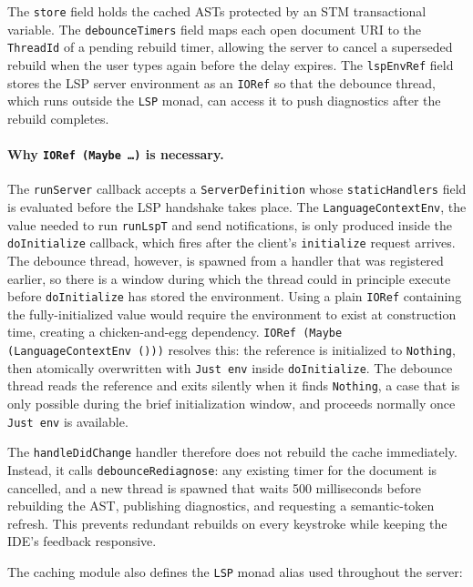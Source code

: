 The \texttt{store} field holds the cached ASTs protected by an STM transactional variable.
The \texttt{debounceTimers} field maps each open document URI to the \texttt{ThreadId} of a pending rebuild timer, allowing the server to cancel a superseded rebuild when the user types again before the delay expires.
The \texttt{lspEnvRef} field stores the LSP server environment as an \texttt{IORef} so that the debounce thread, which runs outside the \texttt{LSP} monad, can access it to push diagnostics after the rebuild completes.

\paragraph{Why \texttt{IORef (Maybe \ldots)} is necessary.}
The \texttt{runServer} callback accepts a \texttt{ServerDefinition} whose \texttt{staticHandlers} field is evaluated before the LSP handshake takes place.
The \texttt{LanguageContextEnv}, the value needed to run \texttt{runLspT} and send notifications, is only produced inside the \texttt{doInitialize} callback, which fires after the client's \texttt{initialize} request arrives.
The debounce thread, however, is spawned from a handler that was registered earlier, so there is a window during which the thread could in principle execute before \texttt{doInitialize} has stored the environment.
Using a plain \texttt{IORef} containing the fully-initialized value would require the environment to exist at construction time, creating a chicken-and-egg dependency.
\texttt{IORef (Maybe (LanguageContextEnv ()))} resolves this: the reference is initialized to \texttt{Nothing}, then atomically overwritten with \texttt{Just env} inside \texttt{doInitialize}.
The debounce thread reads the reference and exits silently when it finds \texttt{Nothing}, a case that is only possible during the brief initialization window, and proceeds normally once \texttt{Just env} is available.

The \texttt{handleDidChange} handler therefore does not rebuild the cache immediately.
Instead, it calls \texttt{debounceRediagnose}: any existing timer for the document is cancelled, and a new thread is spawned that waits 500 milliseconds before rebuilding the AST, publishing diagnostics, and requesting a semantic-token refresh.
This prevents redundant rebuilds on every keystroke while keeping the IDE's feedback responsive.

The caching module also defines the \texttt{LSP} monad alias used throughout the server:

